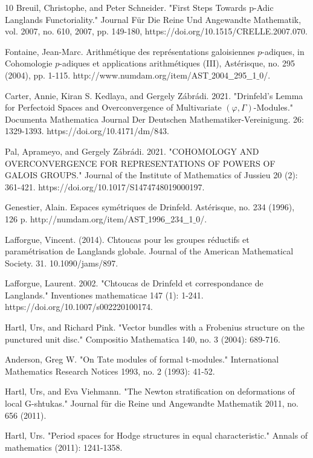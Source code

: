 \documentclass[12pt]{article}
\theoremstyle{definition}
\numberwithin{equation}{section}
\begin{document}
\begin{thebibliography}{10}
 Breuil, Christophe, and Peter Schneider. "First Steps Towards p-Adic Langlands Functoriality." Journal F\"ur Die Reine Und Angewandte Mathematik, vol. 2007, no. 610, 2007, pp. 149-180, https://doi.org/10.1515/CRELLE.2007.070.

 Fontaine, Jean-Marc. Arithm\'etique des repr\'esentations galoisiennes $p$-adiques, in Cohomologie $p$-adiques et applications arithm\'etiques (III), Ast\'erisque, no. 295 (2004), pp. 1-115. http://www.numdam.org/item/AST$\_$2004$\_$$\_$295$\_$$\_$1$\_$0/.

 Carter, Annie, Kiran S. Kedlaya, and Gergely Z\'abr\'adi. 2021. "Drinfeld's Lemma for Perfectoid Spaces and Overconvergence of Multivariate $(\varphi, \Gamma)$-Modules." Documenta Mathematica Journal Der Deutschen Mathematiker-Vereinigung. 26: 1329-1393. https://doi.org/10.4171/dm/843.

 Pal, Aprameyo, and Gergely Z\'abr\'adi. 2021. "COHOMOLOGY AND OVERCONVERGENCE FOR REPRESENTATIONS OF POWERS OF GALOIS GROUPS." Journal of the Institute of Mathematics of Jussieu 20 (2): 361-421. https://doi.org/10.1017/S1474748019000197.

 Genestier, Alain. Espaces sym\'etriques de Drinfeld. Ast\'erisque, no. 234 (1996), 126 p. http://numdam.org/item/AST$\_$1996$\_\_$234$\_\_$1$\_$0/.

 Lafforgue, Vincent. (2014). Chtoucas pour les groupes r\'eductifs et param\'etrisation de Langlands globale. Journal of the American Mathematical Society. 31. 10.1090/jams/897. 


  Lafforgue, Laurent. 2002. "Chtoucas de Drinfeld et correspondance de Langlands." Inventiones mathematicae 147 (1): 1-241. https://doi.org/10.1007/s002220100174.

 Hartl, Urs, and Richard Pink. "Vector bundles with a Frobenius structure on the punctured unit disc." Compositio Mathematica 140, no. 3 (2004): 689-716.

 Anderson, Greg W. "On Tate modules of formal t-modules." International Mathematics Research Notices 1993, no. 2 (1993): 41-52.

 Hartl, Urs, and Eva Viehmann. "The Newton stratification on deformations of local G-shtukas." Journal f\"ur die Reine und Angewandte Mathematik 2011, no. 656 (2011).

 Hartl, Urs. "Period spaces for Hodge structures in equal characteristic." Annals of mathematics (2011): 1241-1358.


\end{thebibliography}
\end{document}
